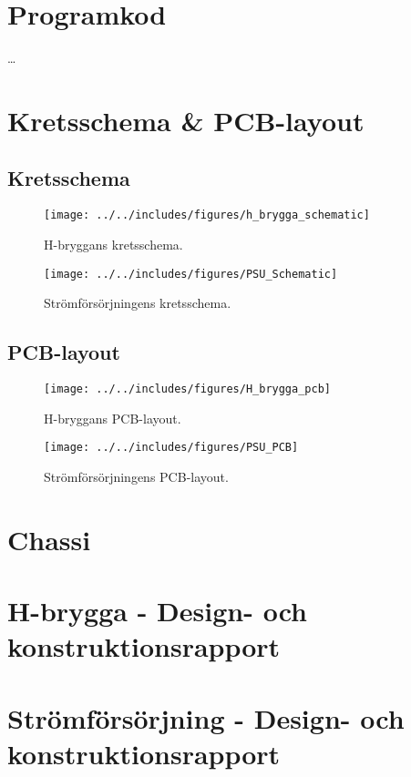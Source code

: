 \appendix

\section{Programkod}
\ldots

\section{Kretsschema \& PCB-layout}
\subsection{Kretsschema}
\begin{landscape}
\begin{figure}[htbp!]
\centering
\texttt{[image: ../../includes/figures/h\_brygga\_schematic]}
\caption{H-bryggans kretsschema.}
\label{fig:appendix_h_brygga_schema}
\end{figure}
\end{landscape}

\begin{landscape}
\begin{figure}[htbp!]
\centering
\texttt{[image: ../../includes/figures/PSU\_Schematic]}
\caption{Strömförsörjningens kretsschema.}
\label{fig:appendix_PSU_schema}
\end{figure}
\end{landscape}

\subsection{PCB-layout}
\begin{figure}[htbp!]
\centering
\texttt{[image: ../../includes/figures/H\_brygga\_pcb]}
\caption{H-bryggans PCB-layout.}
\label{fig:appendix_pcb_layout}
\end{figure}

\begin{figure}[htbp!]
\centering
\texttt{[image: ../../includes/figures/PSU\_PCB]}
\caption{Strömförsörjningens PCB-layout.}
\label{fig:appendix_PSU_pcb_layout}
\end{figure}

\section{Chassi}


\newpage
\section{H-brygga - Design- och konstruktionsrapport}
\label{apx:H-bridge}

\newpage
\section{Strömförsörjning - Design- och konstruktionsrapport}
\label{apx:PSU}

